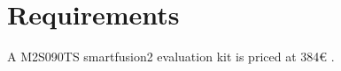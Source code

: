 \section{Requirements}\label{chap:evaluation:requirements}

A M2S090TS smartfusion2 evaluation kit is priced at 384€ \cite{smartfusionPrice}.


